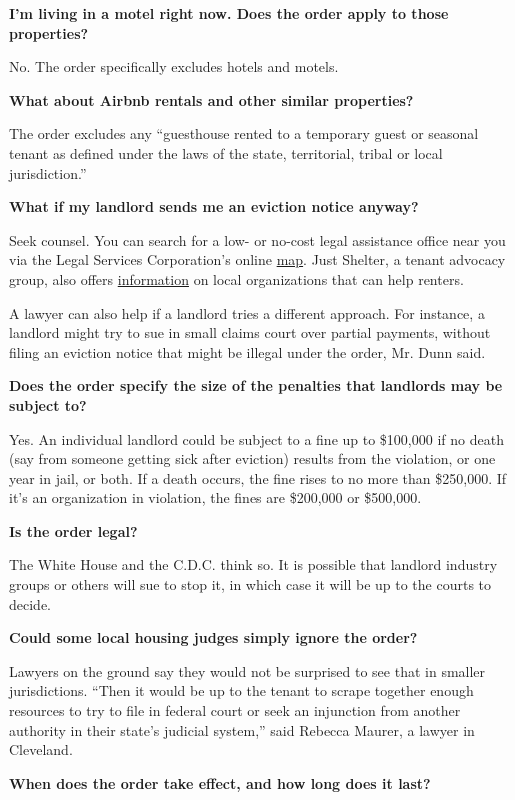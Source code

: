 \textbf{I'm living in a motel right now. Does the order apply to those
properties?}

No. The order specifically excludes hotels and motels.

\textbf{What about Airbnb rentals and other similar properties?}

The order excludes any ``guesthouse rented to a temporary guest or
seasonal tenant as defined under the laws of the state, territorial,
tribal or local jurisdiction.''

\textbf{What if my landlord sends me an eviction notice anyway?}

Seek counsel. You can search for a low- or no-cost legal assistance
office near you via the Legal Services Corporation's online
\href{https://www.lsc.gov/what-legal-aid/find-legal-aid}{map}. Just
Shelter, a tenant advocacy group, also offers
\href{https://justshelter.org/community-resources/}{information} on
local organizations that can help renters.

A lawyer can also help if a landlord tries a different approach. For
instance, a landlord might try to sue in small claims court over partial
payments, without filing an eviction notice that might be illegal under
the order, Mr. Dunn said.

\textbf{Does the order specify the size of the penalties that landlords
may be subject to?}

Yes. An individual landlord could be subject to a fine up to \$100,000
if no death (say from someone getting sick after eviction) results from
the violation, or one year in jail, or both. If a death occurs, the fine
rises to no more than \$250,000. If it's an organization in violation,
the fines are \$200,000 or \$500,000.

\textbf{Is the order legal?}

The White House and the C.D.C. think so. It is possible that landlord
industry groups or others will sue to stop it, in which case it will be
up to the courts to decide.

\textbf{Could some local housing judges simply ignore the order?}

Lawyers on the ground say they would not be surprised to see that in
smaller jurisdictions. ``Then it would be up to the tenant to scrape
together enough resources to try to file in federal court or seek an
injunction from another authority in their state's judicial system,''
said Rebecca Maurer, a lawyer in Cleveland.

\textbf{When does the order take effect, and how long does it last?}

